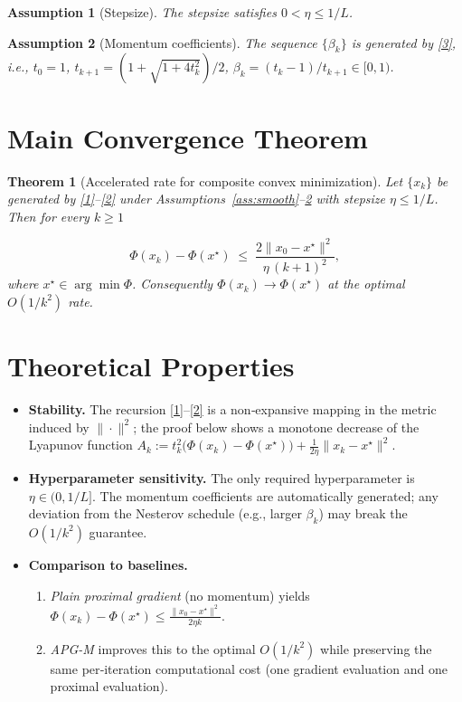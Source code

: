 \documentclass{article}
\newtheorem{theorem}{Theorem}
\newtheorem{assumption}{Assumption}
\begin{document}
\begin{assumption}[Stepsize]\label{ass:stepsize}
The stepsize satisfies $0<\eta\le 1/L$.
\end{assumption}

\begin{assumption}[Momentum coefficients]\label{ass:beta}
The sequence $\{\beta_{k}\}$ is generated by \eqref{3}, i.e., $t_{0}=1$, $t_{k+1}=(1+\sqrt{1+4t_{k}^{2}})/2$, $\beta_{k}=(t_{k}-1)/t_{k+1}\in[0,1)$. 
\end{assumption}

\vspace{0.2cm}
\section*{Main Convergence Theorem}
\begin{theorem}[Accelerated rate for composite convex minimization]\label{thm:rate}
Let $\{x_{k}\}$ be generated by \eqref{1}–\eqref{2} under Assumptions~\ref{ass:smooth}–\ref{ass:beta} with stepsize $\eta\le 1/L$. Then for every $k\ge 1$  

\[
\Phi(x_{k})- \Phi(x^{\star})\;\le\; \frac{2\|x_{0}-x^{\star}\|^{2}}{\eta\, (k+1)^{2}}, \tag{4}
\]
where $x^{\star}\in\arg\min\Phi$.
Consequently $\Phi(x_{k})\to \Phi(x^{\star})$ at the optimal $O(1/k^{2})$ rate.
\end{theorem}

\vspace{0.2cm}
\section*{Theoretical Properties}
\begin{itemize}[leftmargin=*]
\item \textbf{Stability.} The recursion \eqref{1}–\eqref{2} is a non‑expansive mapping in the metric induced by $\|\cdot\|^{2}$; the proof below shows a monotone decrease of the Lyapunov function $A_{k}:=t_{k}^{2}\bigl(\Phi(x_{k})-\Phi(x^{\star})\bigr)+\frac{1}{2\eta}\|x_{k}-x^{\star}\|^{2}$.
\item \textbf{Hyperparameter sensitivity.} The only required hyperparameter is $\eta\in(0,1/L]$. The momentum coefficients are automatically generated; any deviation from the Nesterov schedule (e.g., larger $\beta_{k}$) may break the $O(1/k^{2})$ guarantee.
\item \textbf{Comparison to baselines.}
    \begin{enumerate}
        \item \emph{Plain proximal gradient} (no momentum) yields $\Phi(x_{k})-\Phi(x^{\star})\le \frac{\|x_{0}-x^{\star}\|^{2}}{2\eta k}$.
        \item \emph{APG-M} improves this to the optimal $O(1/k^{2})$ while preserving the same per‑iteration computational cost (one gradient evaluation and one proximal evaluation).
    \end{enumerate}
\end{itemize}
\end{document}
